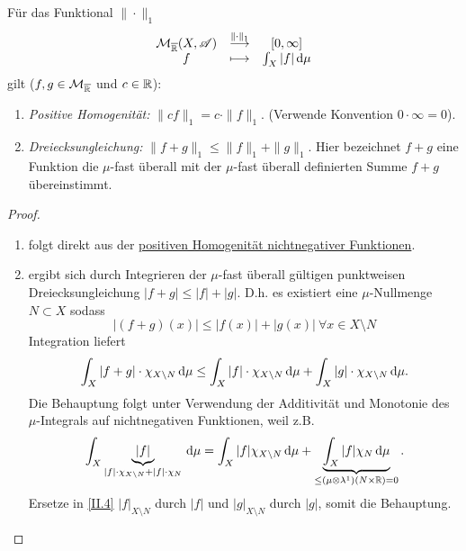 \begin{lemma}
\begin{mdframed}
Für das Funktional $\|\cdot\|_1$
\begin{equation*}
\begin{array}{ccc}
\mathcal{M}_{\overline{\mathbb{R}}}(X,\mathscr{A}) & \overset{\|\cdot\|_1}\longrightarrow & [0,\infty]\\
f & \longmapsto &  \int_X|f|\, \mathrm{d}\mu
\end{array}
\end{equation*}
gilt ($f,g \in \mathcal{M}_{\overline{\mathbb{R}}}$ und $c\in\mathbb{R}$):
\begin{enumerate}
\item \emph{Positive Homogenität:} $\|cf\|_1 = c\cdot \|f\|_1$. (Verwende Konvention $0\cdot \infty=0$).
\item \emph{Dreiecksungleichung:} $\|f+g\|_1\leq \|f\|_1 +\|g\|_1$. Hier bezeichnet $f+g$ eine Funktion die $\mu$-fast überall mit der $\mu$-fast überall definierten Summe $f+g$ übereinstimmt.
\end{enumerate}
\end{mdframed}
\begin{proof}
\begin{enumerate}
\item folgt direkt aus der \hyperref[homogen-nicht-neg]{positiven Homogenität nichtnegativer Funktionen}.
\item ergibt sich durch Integrieren der $\mu$-fast überall gültigen punktweisen Dreiecksungleichung $|f+g|\leq |f|+|g|$. D.h. es existiert eine $\mu$-Nullmenge $N\subset X$ sodass 
$$|(f+g)(x)|\leq |f(x)|+|g(x)| \ \forall x \in X\setminus N$$
Integration liefert
\begin{equation}\label{II.4}
\int_X |f+g|\cdot \chi_{X\setminus N} \, \mathrm{d} \mu \leq \int_X |f|\cdot \chi_{X\setminus N} \, \mathrm{d} \mu + \int_X |g|\cdot \chi_{X\setminus N}\, \mathrm{d}\mu.
\end{equation}
Die Behauptung folgt unter Verwendung der Additivität und Monotonie des $\mu$-Integrals auf nichtnegativen Funktionen, weil z.B.
$$
\int_X\underbrace{|f|}_{|f|\cdot\chi_{X\setminus N} +|f|\cdot \chi_N}\, \mathrm{d}\mu = \int_X |f|\chi_{X\setminus N}\, \mathrm{d}\mu+\underbrace{\int_X|f|\chi_N\, \mathrm{d}\mu}_{\leq (\mu\otimes \lambda^1)(N\times \mathbb{R})=0}.
$$
Ersetze in \eqref{II.4} $|f|_{X\setminus N}$ durch $|f|$ und $|g|_{X\setminus N}$ durch $|g|$,  somit die Behauptung.
\end{enumerate}
\end{proof}
\end{lemma}

